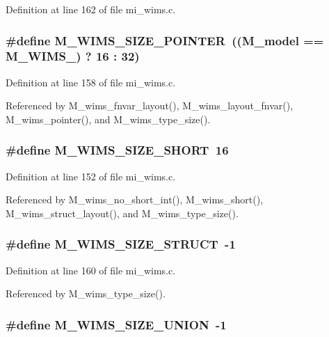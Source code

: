 Definition at line 162 of file mi\_\-wims.c.
\subsubsection{\setlength{\rightskip}{0pt plus 5cm}\#define M\_\-WIMS\_\-SIZE\_\-POINTER~((\bf{M\_\-model} == M\_\-WIMS\_) ? 16 : 32)}\label{mi__wims_8c_ebe2eb629e9f5f81551d0f380ae04bad}




Definition at line 158 of file mi\_\-wims.c.

Referenced by M\_\-wims\_\-fnvar\_\-layout(), M\_\-wims\_\-layout\_\-fnvar(), M\_\-wims\_\-pointer(), and M\_\-wims\_\-type\_\-size().
\subsubsection{\setlength{\rightskip}{0pt plus 5cm}\#define M\_\-WIMS\_\-SIZE\_\-SHORT~16}\label{mi__wims_8c_f61b80664bea1c519a9621dff604ff15}




Definition at line 152 of file mi\_\-wims.c.

Referenced by M\_\-wims\_\-no\_\-short\_\-int(), M\_\-wims\_\-short(), M\_\-wims\_\-struct\_\-layout(), and M\_\-wims\_\-type\_\-size().
\subsubsection{\setlength{\rightskip}{0pt plus 5cm}\#define M\_\-WIMS\_\-SIZE\_\-STRUCT~-1}\label{mi__wims_8c_0456cc76e243b3dc8e89906907409584}




Definition at line 160 of file mi\_\-wims.c.

Referenced by M\_\-wims\_\-type\_\-size().
\subsubsection{\setlength{\rightskip}{0pt plus 5cm}\#define M\_\-WIMS\_\-SIZE\_\-UNION~-1}\label{mi__wims_8c_3a41f85b04228a432a0e60f50985c2f3}




